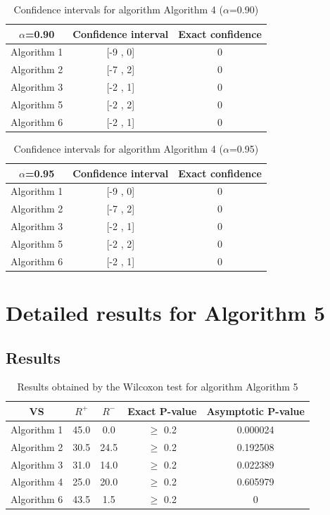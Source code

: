 \documentclass[a4paper,10pt]{article}
\begin{document}
\begin{table}[!htp]
\centering\small
\begin{tabular}{
|c|c|c|}
\hline
 $\alpha$=0.90 & Confidence interval & Exact confidence \\ \hline 
Algorithm 1 & [-9 , 0] & 0\\ \hline 
Algorithm 2 & [-7 , 2] & 0\\ \hline 
Algorithm 3 & [-2 , 1] & 0\\ \hline 
Algorithm 5 & [-2 , 2] & 0\\ \hline 
Algorithm 6 & [-2 , 1] & 0\\ \hline 

\end{tabular}
\caption{Confidence intervals for algorithm Algorithm 4 ($\alpha$=0.90)}
\end{table}
\begin{table}[!htp]
\centering\small
\begin{tabular}{
|c|c|c|}
\hline
 $\alpha$=0.95 & Confidence interval & Exact confidence \\ \hline 
Algorithm 1 & [-9 , 0] & 0\\ \hline 
Algorithm 2 & [-7 , 2] & 0\\ \hline 
Algorithm 3 & [-2 , 1] & 0\\ \hline 
Algorithm 5 & [-2 , 2] & 0\\ \hline 
Algorithm 6 & [-2 , 1] & 0\\ \hline 

\end{tabular}
\caption{Confidence intervals for algorithm Algorithm 4 ($\alpha$=0.95)}
\end{table}

 \clearpage 


\section{Detailed results for Algorithm 5}


\subsection{Results}

\begin{table}[!htp]
\centering\small
\begin{tabular}{
|c|c|c|c|c|}
\hline
 VS & $R^{+}$ & $R^{-}$ & Exact P-value & Asymptotic P-value \\ \hline 
Algorithm 1 & 45.0 & 0.0 & $\geq$ 0.2 & 0.000024\\ \hline 
Algorithm 2 & 30.5 & 24.5 & $\geq$ 0.2 & 0.192508\\ \hline 
Algorithm 3 & 31.0 & 14.0 & $\geq$ 0.2 & 0.022389\\ \hline 
Algorithm 4 & 25.0 & 20.0 & $\geq$ 0.2 & 0.605979\\ \hline 
Algorithm 6 & 43.5 & 1.5 & $\geq$ 0.2 & 0\\ \hline 

\end{tabular}
\caption{Results obtained by the Wilcoxon test for algorithm Algorithm 5}
\end{table}
\end{document}
